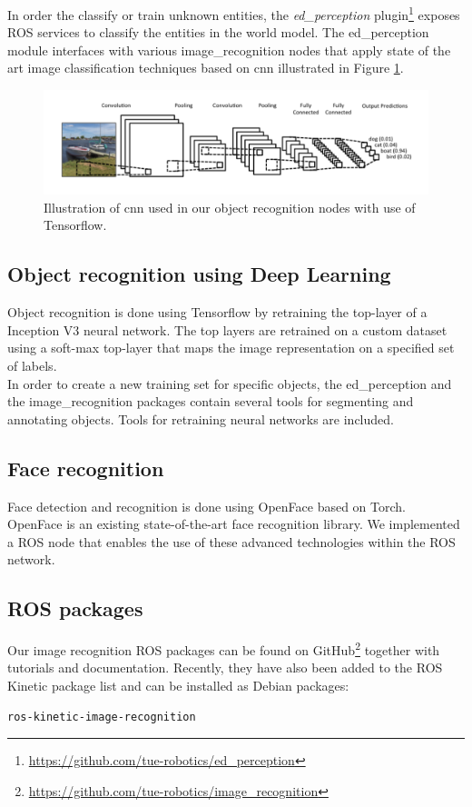In order the classify or train unknown entities, the \emph{ed\_perception} plugin\footnote{\url{https://github.com/tue-robotics/ed_perception}} exposes ROS services to classify the entities in the world model. The ed\_perception module interfaces with various image\_recognition nodes that apply state of the art image classification techniques based on \acrfull{cnn} illustrated in Figure \ref{fig:cnn}.
\begin{figure}[H]
    \centering
	\includegraphics[width = 1\linewidth]{Figures/cnn}
    \caption{Illustration of \acrfull{cnn} used in our object recognition nodes with use of Tensorflow.}
	\label{fig:cnn}
\end{figure}

\subsection{Object recognition using Deep Learning}
Object recognition is done using Tensorflow by retraining the top-layer of a Inception V3 neural network. The top layers are retrained on a custom dataset using a soft-max top-layer that maps the image representation on a specified set of labels.
\\
In order to create a new training set for specific objects, the ed\_perception and the image\_recognition packages contain several tools for segmenting and annotating objects. Tools for retraining neural networks are included.

\subsection{Face recognition}
Face detection and recognition is done using OpenFace based on Torch. OpenFace is an existing state-of-the-art face recognition library. We implemented a ROS node that enables the use of these advanced technologies within the ROS network.
\subsection{ROS packages}
Our image recognition ROS packages can be found on GitHub\footnote{\url{https://github.com/tue-robotics/image_recognition}} together with tutorials and documentation. Recently, they have also been added to the ROS Kinetic package list and can be installed as Debian packages:
\begin{lstlisting}
ros-kinetic-image-recognition
\end{lstlisting} 